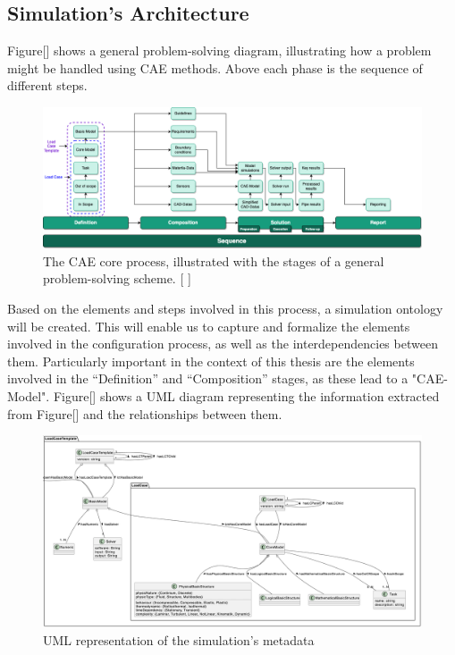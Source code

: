 \subsection{Simulation's Architecture}
Figure[] shows a general problem-solving diagram, illustrating how a problem might be handled using CAE methods. Above each phase is the sequence of different steps.\\

\begin{figure}[H]
    \centering
    \includegraphics[width=\textwidth]{images/Concept-cae-process.drawio.png}
    \caption{\label{fig:cea-proc}  The CAE core process, illustrated with the stages of a general problem-solving scheme. [ ]}
\end{figure}

Based on the elements and steps involved in this process, a simulation ontology will be created. This will enable us to capture and formalize the elements involved in the configuration process, as well as the interdependencies between them. Particularly important in the context of this thesis are the elements involved in the “Definition” and “Composition” stages, as these lead to a "CAE-Model". Figure[] shows a UML diagram representing the information extracted from Figure[] and the relationships between them.\\

\begin{figure}[H]
    \centering
    \includegraphics[width=\textwidth]{images/UML-Sim.png}
    \caption{\label{fig:uml-sim}  UML representation of the simulation’s metadata}
\end{figure}


